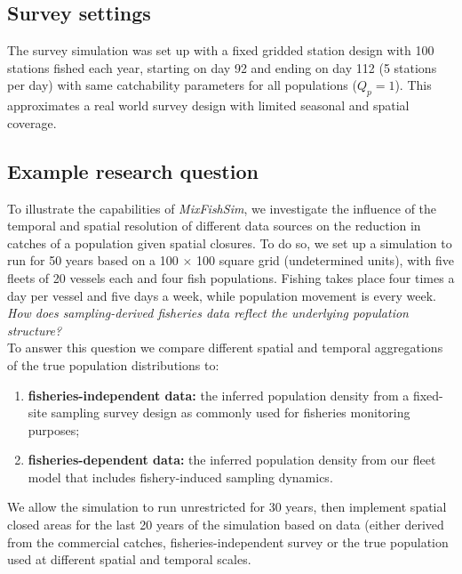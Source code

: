 \documentclass[review]{elsarticle}
\begin{document}
\subsection{Survey settings}

The survey simulation was set up with a fixed gridded station design with 100
stations fished each year, starting on day 92 and ending on day 112 (5 stations
per day) with same catchability parameters for all populations ($Q_{p} = 1$).
This approximates a real world survey design with limited seasonal and spatial
coverage. 

\subsection{Example research question}

To illustrate the capabilities of \textit{MixFishSim}, we investigate the
influence of the temporal and spatial resolution of different data sources on
the reduction in catches of a population given spatial closures. To do so, we
set up a simulation to run for 50 years based on a 100 $\times$ 100 square grid
(undetermined units), with five fleets of 20 vessels each and four fish
populations. Fishing takes place four times a day per vessel and five days a
week, while population movement is every week. \\

\textit{How does sampling-derived fisheries data reflect the underlying
	population structure?} \\

To answer this question we compare different spatial and temporal aggregations
of the true population distributions to:
\begin{enumerate}[label=\alph*)]
	\item \textbf{fisheries-independent data:} the inferred population
		density from a fixed-site sampling survey design as commonly
		used for
		fisheries monitoring purposes;
	\item \textbf{fisheries-dependent data:} the inferred population
		density from our fleet model that includes fishery-induced
		sampling dynamics.
\end{enumerate}

We allow the simulation to run unrestricted for 30 years, then implement
spatial closed areas for the last 20 years of the simulation based on data
(either derived from the commercial catches, fisheries-independent survey or
the true population used at different spatial and temporal scales. \\
\end{document}
